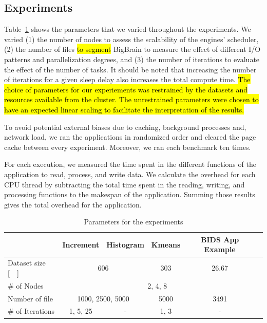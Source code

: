 \documentclass[AMA,STIX1COL]{WileyNJD-v2}
\newcommand{\HL}[1]{\hl{#1}}
\begin{document}
\subsection{Experiments}
Table~\ref{table:parameters} shows the parameters that we varied
throughout the experiments. We varied (1) the number of nodes to assess
the scalability of the engines' scheduler, (2) the number of files \HL{to segment}
BigBrain to measure the effect of different I/O patterns and parallelization degrees, and (3) the
number of iterations to evaluate the effect of the number of tasks.
It should be noted that increasing the number of iterations for a given sleep 
delay also increases the total compute time.
\HL{
	The choice of parameters for our experiements was restrained by the datasets
	and resources available from the cluster.
	The unrestrained parameters were chosen to have an expected linear scaling 
	to facilitate the interpretation of the results.
}
												
To avoid potential external biases due to caching, background processes and,
network load, we ran the applications in randomized order and cleared the
page cache between every experiment.
Moreover, we ran each benchmark ten times.
												
For each execution, we measured the time spent in the different functions of the
application to read, process, and write data.
We calculate the overhead for each CPU thread by subtracting the total time
spent in the reading, writing, and processing functions to the makespan of the application.
Summing those results gives the total overhead for the application.
												
\begin{table}[t]
	\renewcommand{\arraystretch}{1.5}
	\caption{Parameters for the experiments}\label{table:parameters}
	\centering
	\begin{tabular}{|l|c|c|c|c|c|}
		\hline           & Increment & Histogram & Kmeans & BIDS App Example \\\hline
		Dataset size [\SI{}{\gibi\byte}] &\multicolumn{2}{c|}{606} & 303 & \multicolumn{1}{c|}{26.67} \\\hline
		\# of Nodes & \multicolumn{4}{c|}{2, 4, 8} \\\hline
		Number of file & \multicolumn{2}{c|}{1000, 2500, 5000} & 5000 & \multicolumn{1}{c|}{3491} \\\hline
		\# of Iterations & 1, 5, 25  & -         & 1, 3   & -                \\\hline
	\end{tabular}
\end{table}
												
\end{document}
